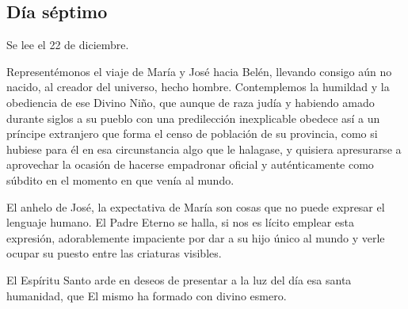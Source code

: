 \documentclass[spanish,utf8,twocolumn]{chlart}
\newenvironment{summary}{\begingroup
	\small\sffamily\itshape%
	\setlength{\leftskip}{3em}\setlength{\rightskip}{3em}\noindent
	}{\par\endgroup}
\newenvironment{lectura}{\begingroup\color{lector}}{\endgroup\par}
\begin{document}
\subsection*{Día séptimo}
\begin{summary}
Se lee el 22 de diciembre.
\end{summary}
\begin{lectura}
Representémonos el viaje de María y José hacia Belén, llevando consigo
aún no nacido, al creador del universo, hecho hombre.
Contemplemos la humildad y la obediencia de ese Divino Niño, que aunque
de raza judía y habiendo amado durante siglos a su pueblo con una
predilección inexplicable obedece así a un príncipe extranjero que forma
el censo de población de su provincia, como si hubiese para él en esa
circunstancia algo que le halagase, y quisiera apresurarse a aprovechar
la ocasión de hacerse empadronar oficial y auténticamente como súbdito
en el momento en que venía al mundo.

El anhelo de José, la expectativa de María son cosas que no puede
expresar el lenguaje humano.
El Padre Eterno se halla, si nos es lícito emplear esta expresión,
adorablemente impaciente por dar a su hijo único al mundo y verle ocupar
su puesto entre las criaturas visibles.

El Espíritu Santo arde en deseos de presentar a la luz del día esa santa
humanidad, que El mismo ha formado con divino esmero.
\end{lectura}
\end{document}
